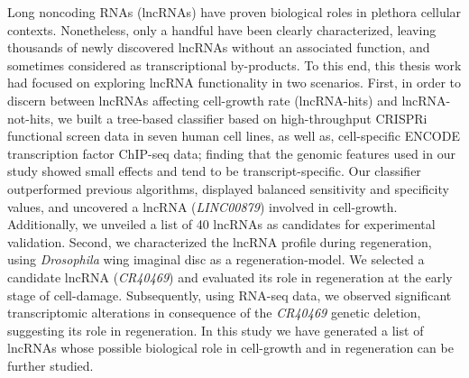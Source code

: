 Long noncoding RNAs (lncRNAs) have proven biological roles in plethora cellular contexts. Nonetheless, only a handful have been clearly characterized, leaving thousands of newly discovered lncRNAs without an associated function, and sometimes considered as transcriptional by-products. To this end, this thesis work had focused on exploring lncRNA functionality in two scenarios. First, in order to discern between lncRNAs affecting cell-growth rate (lncRNA-hits) and lncRNA-not-hits, we built a tree-based classifier based on high-throughput CRISPRi functional screen data in seven human cell lines, as well as, cell-specific ENCODE transcription factor ChIP-seq data; finding that the genomic features used in our study showed small effects and tend to be transcript-specific. Our classifier outperformed previous algorithms, displayed balanced sensitivity and specificity values, and uncovered a lncRNA (\textit{LINC00879}) involved in cell-growth. Additionally, we unveiled a list of 40 lncRNAs as candidates for experimental validation. Second, we characterized the lncRNA profile during regeneration, using \textit{Drosophila} wing imaginal disc as a regeneration-model. We selected a candidate lncRNA (\textit{CR40469}) and evaluated its role in regeneration at the early stage of cell-damage. Subsequently, using RNA-seq data, we observed significant transcriptomic alterations in consequence of the \textit{CR40469} genetic deletion, suggesting its role in regeneration. In this study we have generated a list of  lncRNAs whose possible biological role in cell-growth and in regeneration can be further studied.
